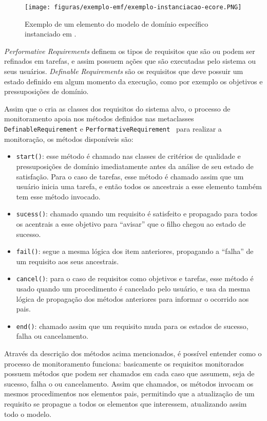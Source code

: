 \begin{figure}[h]
	\centering
	\texttt{[image: figuras/exemplo-emf/exemplo-instanciacao-ecore.PNG]}
	\caption{Exemplo de um elemento do modelo de domínio específico instanciado em \zanshin.}
	\label{figura-metamodelo-antigo}
\end{figure}

\textit{Performative Requirements} definem os tipos de requisitos que são ou podem ser refinados em tarefas, e assim possuem ações que são executadas pelo sistema ou seus usuários. \textit{Definable Requirements} são os requisitos que deve possuir um estado definido em algum momento da execução, como por exemplo os objetivos e pressuposições de domínio.

Assim que o \zanshin cria as classes dos requisitos do sistema alvo, o processo de monitoramento apoia nos métodos definidos nas metaclasses \texttt{DefinableRequirement} e \texttt{PerformativeRequirement}~\cite{tesevitor} para realizar a monitoração, os métodos disponíveis são:
\begin{itemize}
	\item \texttt{start()}: esse método é chamado nas classes de critérios de qualidade e pressuposições de domínio imediatamente antes da análise de seu estado de satisfação. Para o caso de tarefas, esse método é chamado assim que um usuário inicia uma tarefa, e então todos os ancestrais a esse elemento também tem esse método invocado.
	\item \texttt{sucess()}: chamado quando um requisito é satisfeito e propagado para todos os acentrais a esse objetivo para ``avisar'' que o filho chegou ao estado de sucesso.
	\item \texttt{fail()}: segue a mesma lógica dos item anteriores, propagando a ``falha'' de um requisito aos seus ancestrais.
	\item \texttt{cancel()}: para o caso de requisitos como objetivos e tarefas, esse método é usado quando um procedimento é cancelado pelo usuário, e usa da mesma lógica de propagação dos métodos anteriores para informar o ocorrido aos pais.
	\item \texttt{end()}: chamado assim que um requisito muda para os estados de sucesso, falha ou cancelamento.
\end{itemize}

Através da descrição dos métodos acima mencionados, é possível entender como o processo de monitoramento funciona: basicamente os requisitos monitorados possuem métodos que podem ser chamados em cada caso que assumem, seja de sucesso, falha o ou cancelamento. Assim que chamados, os métodos invocam os mesmos procedimentos nos elementos pais, permitindo que a atualização de um requisito se propague a todos os elementos que interessem, atualizando assim todo o modelo.

